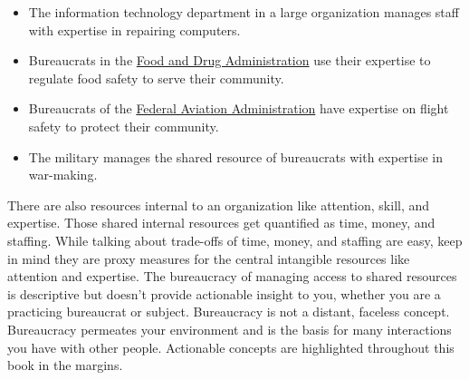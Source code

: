 \begin{itemize}
      \item The information technology department in a large organization manages staff with expertise in repairing computers.%
      \item Bureaucrats in the \href{https://www.fda.gov/}{Food and Drug Administration} use their expertise to regulate food safety to serve their community.%
      \item Bureaucrats of the \href{https://www.faa.gov/}{Federal Aviation Administration} have expertise on flight safety to protect their community.%
      \item The military manages the shared resource of bureaucrats with expertise in war-making.
  \end{itemize}

There are also resources internal to an organization like attention, skill, and expertise. Those shared internal resources get quantified as time, money, and staffing. While talking about trade-offs of time, money, and staffing are easy, keep in mind they are proxy measures for the central intangible resources like attention and expertise.
The bureaucracy of managing access to shared resources is descriptive but doesn't provide actionable insight to you, whether you are a practicing bureaucrat or subject. 
Bureaucracy is not a distant, faceless concept. Bureaucracy permeates your environment and is the basis for many interactions you have with other people. 
Actionable concepts are highlighted throughout this book in the margins.
